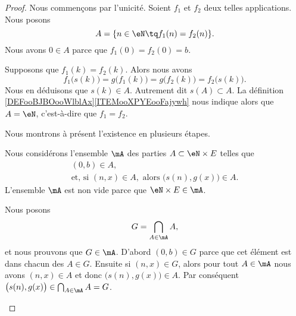 \begin{proof}
	Nous commençons par l'unicité. Soient \( f_1\) et \( f_2\) deux telles applications. Nous posons
	\begin{equation}
		A=\{ n\in \eN\tq f_1(n)=f_2(n) \}.
	\end{equation}
	Nous avons \( 0\in A\) parce que \( f_1(0)=f_2(0)=b\).

	Supposons que \( f_1(k)=f_2(k)\). Alors nous avons
	\begin{equation}
		f_1\big( s(k) \big)=g\big( f_1(k) \big)=g\big( f_2(k) \big)=f_2\big( s(k) \big).
	\end{equation}
	Nous en déduisons que \( s(k)\in A\). Autrement dit \( s(A)\subset A\). La définition \ref{DEFooBJBOooWlblAx}\ref{ITEMooXPYEooFajywh} nous indique alors que \( A=\eN\), c'est-à-dire que \( f_1=f_2\).

	Nous montrons à présent l'existence en plusieurs étapes.
	\begin{subproof}
		Nous considérons l'ensemble \( \mA\) des parties \( A\subset \eN\times E\) telles que
		\begin{gather}
			(0,b)\in A,	\label{SEQooRecurFctPfInit}\\
			\text{et, si } (n,x)\in A,\text{ alors }\big( s(n),g(x) \big)\in A.\label{SEQooRecurFctPfHered}
		\end{gather}
		L'ensemble \( \mA\) est non vide parce que \( \eN\times E\in \mA\).
  
		Nous posons
		\begin{equation}
			G=\bigcap_{A\in \mA}A,
		\end{equation}
		et nous prouvons que \( G\in\mA\). D'abord \( (0,b)\in G\) parce que cet élément est dans chacun des \( A\in G\). Ensuite si \( (n,x)\in G\), alors pour tout \( A\in\mA \) nous avons \( (n,x)\in A\) et donc \( \big( s(n),g(x) \big)\in A\). Par conséquent \( \big( s(n),g(x) \big)\in \bigcap_{A\in\mA}A=G\).
  

\end{subproof}
\end{proof}
